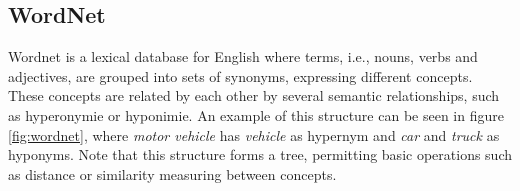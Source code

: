 \documentclass{bsu-ms}
\begin{document}












\subsection{WordNet}
Wordnet \cite{miller1995wordnet} is a lexical database for English where terms, i.e., nouns, verbs and adjectives, are grouped into sets of synonyms, expressing different concepts. These concepts are related by each other by several semantic relationships, such as hyperonymie or hyponimie. An example of this structure can be seen in figure \ref{fig:wordnet}, where \emph{motor vehicle} has \emph{vehicle} as hypernym and \emph{car} and \emph{truck} as hyponyms. Note that this structure forms a tree, permitting basic operations such as distance or similarity measuring between concepts.
\end{document}
